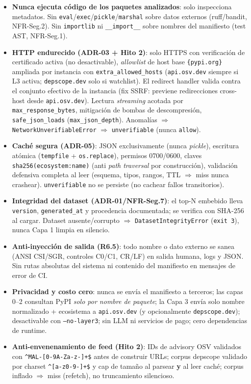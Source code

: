 \documentclass[11pt,a4paper]{article}
\begin{document}
\begin{itemize}[nosep]
  \item \textbf{Nunca ejecuta código de los paquetes analizados}: solo inspecciona
  metadatos. Sin \texttt{eval}/\texttt{exec}/\texttt{pickle}/\texttt{marshal}
  sobre datos externos (ruff/bandit, NFR-Seg.2). Sin \texttt{importlib} ni
  \texttt{__import__} sobre nombres del manifiesto (test AST, NFR-Seg.1).
  \item \textbf{HTTP endurecido (ADR-03 + Hito 2)}: solo HTTPS con verificación de certificado
  activa (no desactivable), \emph{allowlist} de host base \texttt{\{pypi.org\}} ampliada por
  instancia con \texttt{extra\_allowed\_hosts} (\texttt{api.osv.dev} siempre si L3 activa;
  \texttt{depscope.dev} solo si watchlist). El redirect handler valida contra el conjunto
  efectivo de la instancia (fix SSRF: previene redirecciones cross-host desde
  \texttt{api.osv.dev}). Lectura \emph{streaming} acotada por \texttt{max\_response\_bytes},
  mitigación de bombas de descompresión, \texttt{safe\_json\_loads} (\texttt{max\_json\_depth}).
  Anomalías $\Rightarrow$ \texttt{NetworkUnverifiableError} $\Rightarrow$
  \texttt{unverifiable} (nunca \texttt{allow}).
  \item \textbf{Caché segura (ADR-05)}: JSON exclusivamente (nunca \emph{pickle}), escritura
  atómica (\texttt{tempfile} + \texttt{os.replace}), permisos 0700/0600, claves
  \texttt{sha256(ecosystem:name)} (anti \emph{path traversal} por construcción),
  validación defensiva completa al leer (esquema, tipos, rangos, TTL $\Rightarrow$ miss
  nunca crashear). \texttt{unverifiable} no se persiste (no cachear fallos transitorios).
  \item \textbf{Integridad del dataset (ADR-01/NFR-Seg.7)}: el top-N embebido lleva
  \texttt{version}, \texttt{generated_at} y procedencia documentada; se verifica
  con SHA-256 al cargar. Dataset ausente/corrupto $\Rightarrow$
  \texttt{DatasetIntegrityError} (\texttt{exit 3}), nunca Capa 1 limpia en silencio.
  \item \textbf{Anti-inyección de salida (R6.5)}: todo nombre o dato externo se sanea
  (ANSI CSI/SGR, controles C0/C1, CR/LF) en salida humana, logs y JSON. Sin rutas absolutas
  del sistema ni contenido del manifiesto en mensajes de error de CI.
  \item \textbf{Privacidad y costo cero}: nunca se envía el manifiesto a terceros; las
  capas 0--2 consultan PyPI \emph{solo por nombre de paquete}; la Capa 3 envía solo
  nombre normalizado + ecosistema a \texttt{api.osv.dev} (y opcionalmente
  \texttt{depscope.dev}); desactivable con \texttt{--no-layer3}; sin LLM ni servicios
  de pago; cero dependencias de runtime.
  \item \textbf{Anti-envenenamiento de feed (Hito 2)}: IDs de advisory OSV validados con
  \texttt{\^{}MAL-[0-9A-Za-z-]+\$} antes de construir URLs; corpus depscope validado por
  charset \texttt{\^{}[a-z0-9-]+\$} y cap de tamaño al parsear \textbf{y} al leer caché;
  corpus inflado $\Rightarrow$ miss (refetch), no truncamiento silencioso.
\end{itemize}
\end{document}
